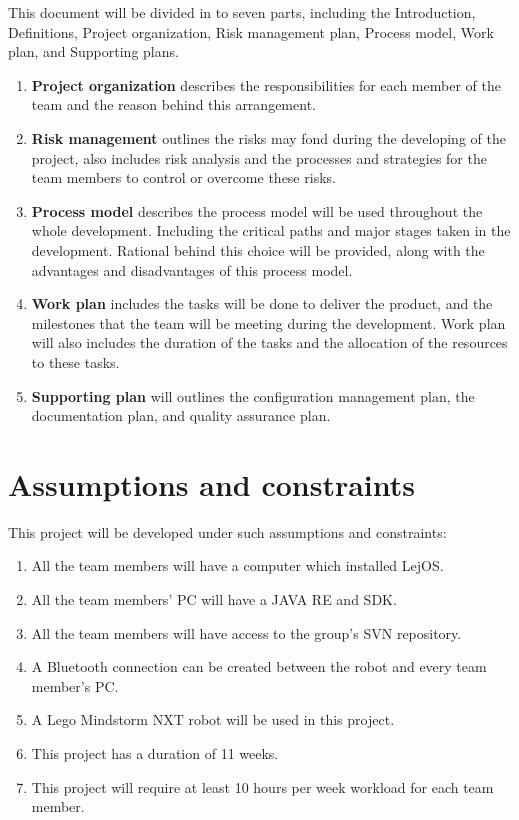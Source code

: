 \documentclass[11pt, a4paper]{report}
\begin{document}
This document will be divided in to seven parts, including the Introduction, Definitions, Project organization, Risk management plan, Process model, Work plan, and Supporting plans.

\begin{enumerate}
	\item \textbf{Project organization} describes the responsibilities for each member of the team and the reason behind this arrangement.
	\item \textbf{Risk management} outlines the risks may fond during the developing of the project, also includes risk analysis and the processes and strategies for the team members to control or overcome these risks.
	\item \textbf{Process model} describes the process model will be used throughout the whole development. Including the critical paths and major stages taken in the development. Rational behind this choice will be provided, along with the advantages and disadvantages of this process model. 
	\item \textbf{Work plan} includes the tasks will be done to deliver the product, and the milestones that the team will be meeting during the development. Work plan will also includes the duration of the tasks and the allocation of the resources to these tasks.
	\item \textbf{Supporting plan} will outlines the configuration management plan, the documentation plan, and quality assurance plan.
\end{enumerate}


\section{Assumptions and constraints}
This project will be developed under such assumptions and constraints:
\begin{enumerate}
	\item All the team members will have a computer which installed LejOS.
	\item All the team members' PC will have a JAVA RE and SDK.
	\item All the team members will have access to the group's SVN repository.
	\item A Bluetooth connection can be created between the robot and every team member's PC.
	\item A Lego Mindstorm NXT robot will be used in this project. \\
	\item This project has a duration of 11 weeks.
	\item This project will require at least 10 hours per week workload for each team member.
\end{enumerate}
\end{document}
